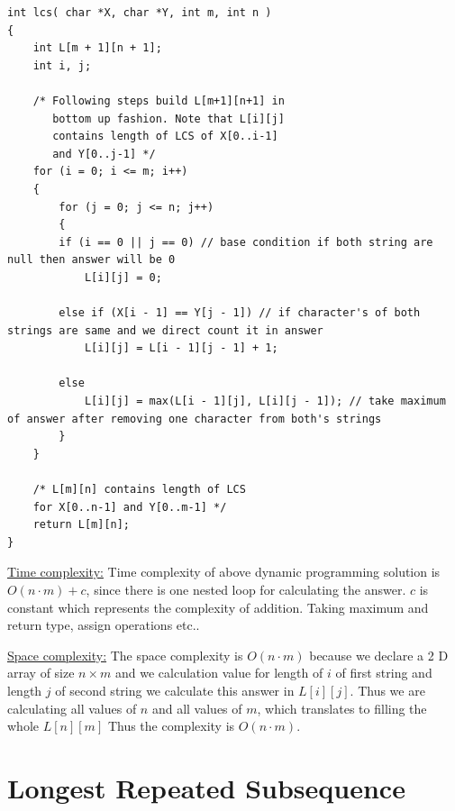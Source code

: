 \documentclass[12pt]{book}
\begin{document}
\begin{lstlisting}
int lcs( char *X, char *Y, int m, int n ) 
{ 
    int L[m + 1][n + 1]; 
    int i, j; 
      
    /* Following steps build L[m+1][n+1] in 
       bottom up fashion. Note that L[i][j] 
       contains length of LCS of X[0..i-1]
       and Y[0..j-1] */
    for (i = 0; i <= m; i++) 
    { 
        for (j = 0; j <= n; j++) 
        { 
        if (i == 0 || j == 0) // base condition if both string are null then answer will be 0
            L[i][j] = 0; 
      
        else if (X[i - 1] == Y[j - 1]) // if character's of both strings are same and we direct count it in answer 
            L[i][j] = L[i - 1][j - 1] + 1; 
      
        else
            L[i][j] = max(L[i - 1][j], L[i][j - 1]); // take maximum of answer after removing one character from both's strings 
        } 
    } 
          
    /* L[m][n] contains length of LCS 
    for X[0..n-1] and Y[0..m-1] */
    return L[m][n]; 
}
\end{lstlisting}

\underline{Time complexity:}\newline
Time complexity of above dynamic programming solution is $O(n \cdot m) + c$, since there is one nested loop for calculating the answer. $c$ is constant which represents the complexity of addition. Taking maximum and return type, assign operations etc..\newline\newline

\underline{Space complexity:}\newline
The space complexity is $O(n \cdot m)$ because we declare a 2 D array of size $n \times m$ and we calculation value for length of $i$ of first string and length $j$ of second string we calculate this answer in $L[i][j]$. Thus we are calculating all values of $n$ and all values of $m$, which translates to filling the whole $L[n][m]$\newline
Thus the complexity is $O(n \cdot m)$.\newline\newline\newline

\section{Longest Repeated Subsequence}
\end{document}
